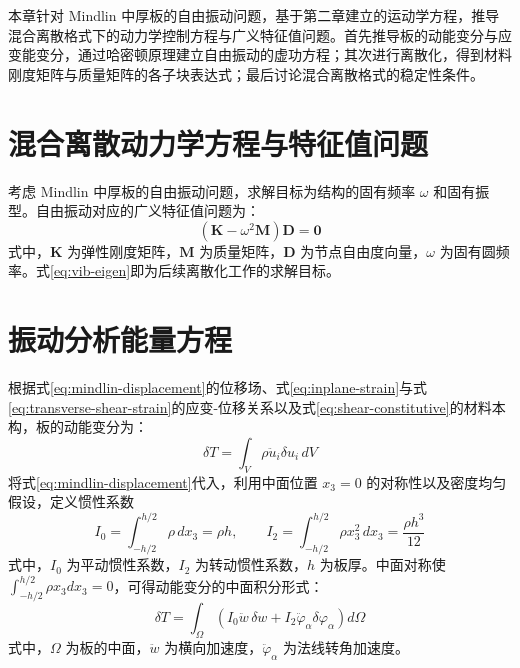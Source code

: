 
本章针对 Mindlin 中厚板的自由振动问题，基于第二章建立的运动学方程，推导混合离散格式下的动力学控制方程与广义特征值问题。首先推导板的动能变分与应变能变分，通过哈密顿原理建立自由振动的虚功方程；其次进行离散化，得到材料刚度矩阵与质量矩阵的各子块表达式；最后讨论混合离散格式的稳定性条件。

\section{混合离散动力学方程与特征值问题}

考虑 Mindlin 中厚板的自由振动问题，求解目标为结构的固有频率 $\omega$ 和固有振型。自由振动对应的广义特征值问题为：
\begin{equation}
(\mathbf{K} - \omega^2 \mathbf{M})\mathbf{D} = \mathbf{0}
\label{eq:vib-eigen}
\end{equation}
式中，$\mathbf{K}$ 为弹性刚度矩阵，$\mathbf{M}$ 为质量矩阵，$\mathbf{D}$ 为节点自由度向量，$\omega$ 为固有圆频率。式\eqref{eq:vib-eigen}即为后续离散化工作的求解目标。

\section{振动分析能量方程}

根据式\eqref{eq:mindlin-displacement}的位移场、式\eqref{eq:inplane-strain}与式\eqref{eq:transverse-shear-strain}的应变-位移关系以及式\eqref{eq:shear-constitutive}的材料本构，板的动能变分为：
\begin{equation}
\delta T = \int_V \rho \ddot{u}_i \delta u_i\, dV
\label{eq:vib-kinetic-variation}
\end{equation}
将式\eqref{eq:mindlin-displacement}代入，利用中面位置 $x_3=0$ 的对称性以及密度均匀假设，定义惯性系数
\begin{equation}
I_0 = \int_{-h/2}^{h/2} \rho\, dx_3 = \rho h, \qquad I_2 = \int_{-h/2}^{h/2} \rho x_3^2\, dx_3 = \frac{\rho h^3}{12}
\label{eq:inertia-coefficients}
\end{equation}
式中，$I_0$ 为平动惯性系数，$I_2$ 为转动惯性系数，$h$ 为板厚。中面对称使 $\int_{-h/2}^{h/2} \rho x_3 dx_3 = 0$，可得动能变分的中面积分形式：
\begin{equation}
\delta T = \int_\Omega \left(I_0 \ddot{w}\,\delta w + I_2 \ddot{\varphi}_\alpha \delta\varphi_\alpha\right) d\Omega
\label{eq:vib-kinetic-midplane}
\end{equation}
式中，$\Omega$ 为板的中面，$\ddot{w}$ 为横向加速度，$\ddot{\varphi}_\alpha$ 为法线转角加速度。

